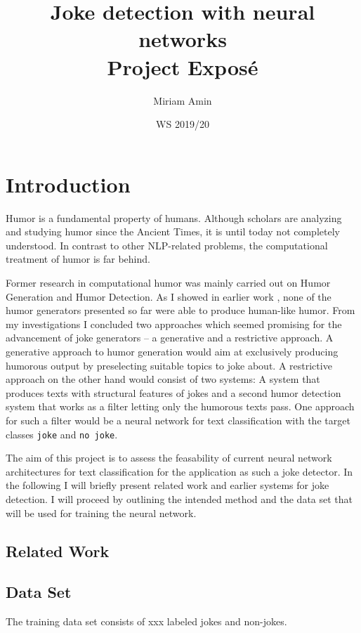 \documentclass[12pt]{scrartcl}
\title{%
	Joke detection with neural networks \\
	\large Project Exposé}
\author{Miriam Amin}
\date{WS 2019/20}
\begin{document}
\maketitle
\tableofcontents

\section{Introduction}
Humor is a fundamental property of humans. Although scholars are analyzing and studying humor since the Ancient Times, it is until today not completely understood. In contrast to other NLP-related problems, the computational treatment of humor is far behind. 

Former research in computational humor was mainly carried out on Humor Generation and Humor Detection. As I showed in earlier work \citep{aminComputationalHumorAutomatic2019}, none of the humor generators presented so far were able to produce human-like humor. From my investigations I concluded two approaches which seemed promising for the advancement of joke generators -- a generative and a restrictive approach. A generative approach to humor generation would aim at exclusively producing humorous output by preselecting suitable topics to joke about. A restrictive approach on the other hand would consist of two systems: A system that produces texts with structural features of jokes and a second humor detection system that works as a filter letting only the humorous texts pass.  
One approach for such a filter would be a neural network for text classification with the target classes \texttt{joke} and \texttt{no joke}.

The aim of this project is to assess the feasability of current neural network architectures for text classification for the application as such a joke detector. In the following I will briefly present related work and earlier systems for joke detection. I will proceed by outlining the intended method and the data set that will be used for training the neural network. 

 
 \cite{aminComputationalHumorAutomatic2019}

\subsection{Related Work}
\subsection{Data Set}
The training data set consists of xxx labeled jokes and non-jokes. 
\end{document}
